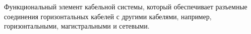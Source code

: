 Функциональный элемент кабельной системы, который
обеспечивает разъемные соединения горизонтальных
кабелей с другими кабелями, например, горизонтальными,
магистральными и сетевыми.